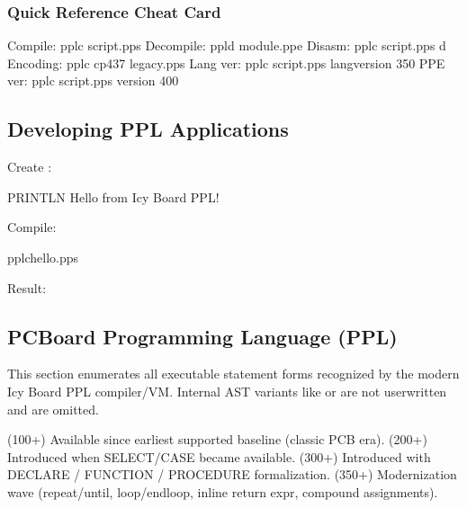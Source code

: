 \documentclass[letterpaper,10pt,english]{sphinxmanual}
\begin{document}
\subsubsection{Quick Reference Cheat Card}
\label{\detokenize{ppl:quick-reference-cheat-card}}
\begin{sphinxVerbatim}[commandchars=\\\{\}]
Compile:    pplc script.pps
Decompile:  ppld module.ppe
Disasm:     pplc script.pps \PYGZhy{}d
Encoding:   pplc \PYGZhy{}\PYGZhy{}cp437 legacy.pps
Lang ver:   pplc script.pps \PYGZhy{}\PYGZhy{}lang\PYGZhy{}version 350
PPE ver:    pplc script.pps \PYGZhy{}\PYGZhy{}version 400
\end{sphinxVerbatim}


\subsection{Developing PPL Applications}
\label{\detokenize{ppl:developing-ppl-applications}}
\sphinxAtStartPar
Create :

\begin{sphinxVerbatim}[commandchars=\\\{\}]
PRINTLN \PYGZdq{}Hello from Icy Board PPL!\PYGZdq{}
\end{sphinxVerbatim}

\sphinxAtStartPar
Compile:

\begin{sphinxVerbatim}[commandchars=\\\{\}]
pplchello.pps
\end{sphinxVerbatim}

\sphinxAtStartPar
Result: 


\subsection{PCBoard Programming Language (PPL)}
\label{\detokenize{ppl:pcboard-programming-language-ppl}}
\sphinxAtStartPar
This section enumerates all executable statement forms recognized by the modern Icy Board PPL compiler/VM.
Internal AST variants like  or  are not user\sphinxhyphen{}written and are omitted.
\begin{description}
\sphinxAtStartPar
(100+)  Available since earliest supported baseline (classic PCB era).
(200+)  Introduced when SELECT/CASE became available.
(300+)  Introduced with DECLARE / FUNCTION / PROCEDURE formalization.
(350+)  Modernization wave (repeat/until, loop/endloop, inline return expr, compound assignments).

\end{description}
\end{document}
